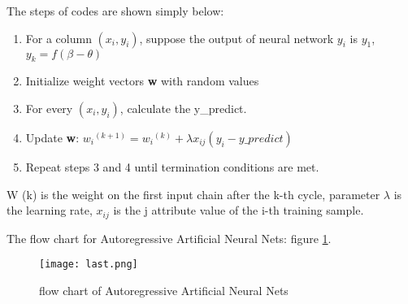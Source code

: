 \documentclass{mcmthesis}
\begin{document}
\par\noindent
The steps of codes are shown simply below:
\begin{enumerate}
	\item For a column $(x_i,y_i)$, suppose the output of neural network $y_i$ is $y_1$, $y_k = f(\beta-\theta)$
	\item Initialize weight vectors \textbf{w} with random values
	\item For every $(x_i,y_i)$, calculate the y\_predict. %
	\item Update \textbf{w}: ${w_i}^{(k+1)}={w_i}^{(k)}+\lambda x_{ij} (y_i-y\_predict)$
	\item Repeat steps 3 and 4 until termination conditions are met.
\end{enumerate}
W (k) is the weight on the first input chain after the k-th cycle, parameter $\lambda$ is the learning rate, $x_{ij}$ is the j attribute value of the i-th training sample.

\par\noindent
The flow chart for Autoregressive Artificial Neural Nets: figure \ref{fig:Plast}.
\begin{figure}[h]
	\centering
	\texttt{[image: last.png]}
	\caption{flow chart of Autoregressive Artificial Neural Nets} \label{fig:Plast}
\end{figure}
\end{document}
